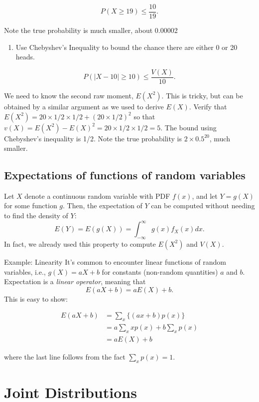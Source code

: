 \documentclass[]{book}
\providecommand{\tightlist}{%
  \setlength{\itemsep}{0pt}\setlength{\parskip}{0pt}}
\begin{document}
\[P(X \geq 19) \leq \frac{10}{19}.\]

Note the true probability is much smaller, about 0.00002

\begin{enumerate}
\def\labelenumi{\arabic{enumi}.}
\setcounter{enumi}{1}
\tightlist
\item
  Use Chebyshev's Inequality to bound the chance there are either 0 or
  20 heads.
\end{enumerate}

\[P(|X - 10|\geq 10)\leq \frac{V(X)}{10}.\]

We need to know the second raw moment, \(E(X^2)\). This is tricky, but
can be obtained by a similar argument as we used to derive \(E(X)\).
Verify that \(E(X^2) = 20\times 1/2 \times 1/2 + (20\times 1/2)^2\) so
that \(v(X) = E(X^2) - E(X)^2 = 20\times 1/2 \times 1/2 = 5\). The bound
using Chebyshev's inequality is 1/2. Note the true probability is
\(2\times 0.5^{20}\), much smaller.

\section{Expectations of functions of random
variables}\label{expectations-of-functions-of-random-variables}

Let \(X\) denote a continuous random variable with PDF \(f(x)\), and let
\(Y = g(X)\) for some function \(g\). Then, the expectation of \(Y\) can
be computed without needing to find the density of \(Y\):
\[E(Y) = E(g(X)) = \int_{-\infty}^\infty g(x)f_X(x)dx.\] In fact, we
already used this property to compute \(E(X^2)\) and \(V(X)\).

Example: Linearity It's common to encounter linear functions of random
variables, i.e., \(g(X) = aX+b\) for constants (non-random quantities)
\(a\) and \(b\). Expectation is a \emph{linear operator}, meaning that
\[E(aX+b) = aE(X)+b.\] This is easy to show:

\begin{align*}
E(aX+b)&= \sum_x \{(ax+b)p(x)\}\\
& = a\sum_x xp(x) + b\sum_x p(x)\\
& = aE(X) + b
\end{align*}

where the last line follows from the fact \(\sum_x p(x)=1\).

\chapter{Joint Distributions}\label{joint-distributions}
\end{document}
